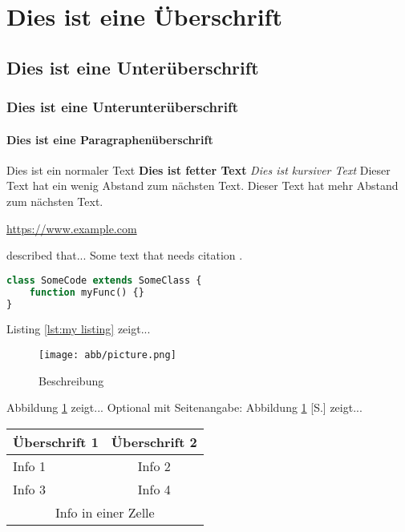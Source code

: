 \section{Dies ist eine Überschrift}
\subsection{Dies ist eine Unterüberschrift}
\subsubsection{Dies ist eine Unterunterüberschrift}
\paragraph{Dies ist eine Paragraphenüberschrift}
Dies ist ein normaler Text
\textbf{Dies ist fetter Text}
\textit{Dies ist kursiver Text}
\medskip
Dieser Text hat ein wenig Abstand zum nächsten Text.
\bigskip
Dieser Text hat mehr Abstand zum nächsten Text.

\url{https://www.example.com}

\textcite{citation_key} described that...
Some text that needs citation \parencite{citation_key}.

\begin{lstlisting}[frame=htrbl, caption={Caption Here}, label={lst:my listing}, language=php]
class SomeCode extends SomeClass {
    function myFunc() {}
}
\end{lstlisting}

Listing \ref{lst:my listing} zeigt...

\begin{figure}[h]
\texttt{[image: abb/picture.png]}
\centering
\caption{Beschreibung \parencite{citation_key}}
\label{fig:my fig}
\end{figure}

Abbildung \ref{fig:my fig} zeigt...
Optional mit Seitenangabe: Abbildung \ref{fig:my fig} [S.\pageref{fig:my fig}] zeigt...


\begin{center}
    \begin{tabular}{ | l | c | }
      \hline
      Überschrift 1 & Überschrift 2 \\ \hline \hline
      Info 1 & Info 2 \\ \hline
      Info 3 & Info 4 \\ \hline
      \hline
      \multicolumn{2}{|c|}{Info in einer Zelle} \\
      \hline
    \end{tabular}
  \end{center}

